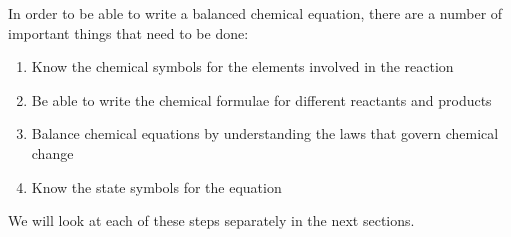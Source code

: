       \label{m38721*id62675}In order to be able to write a balanced chemical equation, there are a number of important things that need to be done:\par 
      \label{m38721*id62681}\begin{enumerate}[noitemsep, label=\textbf{\arabic*}. ] 
            \label{m38721*uid1}\item Know the chemical symbols for the elements involved in the reaction
\label{m38721*uid2}\item Be able to write the chemical formulae for different reactants and products
\label{m38721*uid3}\item Balance chemical equations by understanding the laws that govern chemical change
\label{m38721*uid4}\item Know the state symbols for the equation
\end{enumerate}
      \label{m38721*id62733}We will look at each of these steps separately in the next sections.\par 
    \label{m38721*cid2}
